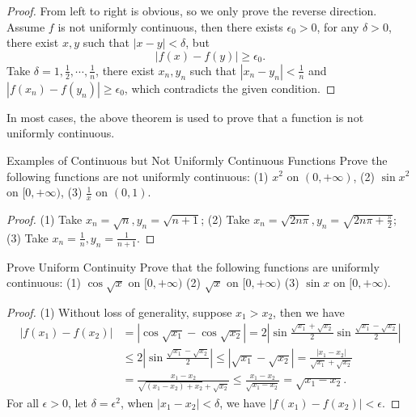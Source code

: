 \begin{proof}
  From left to right is obvious, so we only prove the reverse direction.
  Assume $f$ is not uniformly continuous,
  then there exists $\epsilon_0 > 0$, for any $\delta > 0$,
  there exist $x, y$ such that $|x - y| < \delta$, but
  \begin{equation}
    |f(x) - f(y)| \geq \epsilon_0.
  \end{equation}
  Take $\delta = 1, \frac{1}{2}, \cdots, \frac{1}{n}$, there exist $x_n, y_n$
  such that $|x_n - y_n| < \frac{1}{n}$ and $|f(x_n) - f(y_n)| \geq \epsilon_0$,
  which contradicts the given condition.
\end{proof}

\begin{note}
  In most cases, the above theorem is used to prove that
  a function is not uniformly continuous.
\end{note}

\begin{example}{Examples of Continuous but Not Uniformly Continuous Functions}{}
  Prove the following functions are not uniformly continuous:
  (1) $x^2$ on $(0, +\infty)$,
  (2) $\sin x^2$ on $[0, + \infty)$,
  (3) $\frac{1}{x}$ on $(0, 1)$.
\end{example}

\begin{proof}
  (1) Take $x_n = \sqrt{n}, y_n = \sqrt{n + 1}$;
  (2) Take $x_n = \sqrt{2n \pi}, y_n = \sqrt{2n \pi + \frac{\pi}{2}}$;
  (3) Take $x_n = \frac{1}{n}, y_n = \frac{1}{n+1}$.
\end{proof}

\begin{example}{Prove Uniform Continuity}{}
  Prove that the following functions are uniformly continuous:
  (1) $\cos \sqrt{x}$ on $[0, +\infty)$
  (2) $\sqrt{x}$ on $[0, +\infty)$
  (3) $\sin x$ on $[0, +\infty)$.
\end{example}

\begin{proof}
  (1) Without loss of generality, suppose $x_1 > x_2$,
  then we have
  \begin{align}
    |f(x_1) - f(x_2)| &= |\cos \sqrt{x_1} - \cos \sqrt{x_2}| = 2 \left| \sin \frac{\sqrt{x_1} + \sqrt{x_2}}{2} \sin \frac{\sqrt{x_1} - \sqrt{x_2}}{2} \right|\\
   & \leq 2 \left| \sin \frac{\sqrt{x_1} - \sqrt{x_2}}{2} \right| \leq |\sqrt{x_1} - \sqrt{x_2}| = \frac{|x_1 - x_2|}{\sqrt{x_1} + \sqrt{x_2}}\\
    & = \frac{x_1 - x_2}{\sqrt{(x_1 - x_2) + x_2} + \sqrt{x_2}} \leq \frac{x_1 - x_2}{\sqrt{x_1 - x_2}} = \sqrt{x_1 - x_2}.
  \end{align}
  For all $\epsilon > 0$, let $\delta = \epsilon^2$,
  when $|x_1 - x_2| < \delta$, we have $|f(x_1) - f(x_2)| < \epsilon$.
\end{proof}

